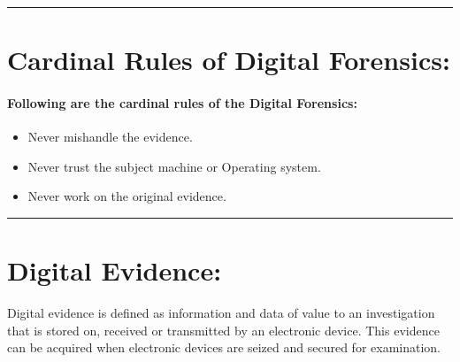 \documentclass[british]{article}
\begin{document}
\rule[0.5ex]{0.75\columnwidth}{1pt}

\section{Cardinal Rules of Digital Forensics:}

\paragraph{Following are the cardinal rules of the Digital Forensics:}
\begin{itemize}
	\item Never mishandle the evidence.
	\item Never trust the subject machine or Operating system.
	\item Never work on the original evidence.
\end{itemize}
\rule[0.5ex]{0.75\columnwidth}{1pt}

\section{Digital Evidence:}

Digital evidence is defined as information and data of value to an
investigation that is stored on, received or transmitted by an electronic
device. This evidence can be acquired when electronic devices are
seized and secured for examination.
\end{document}
